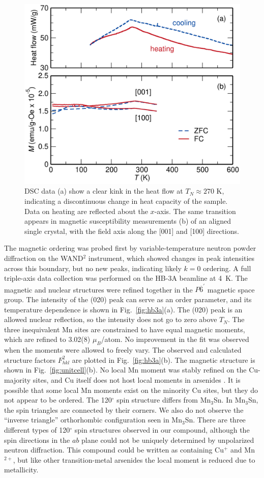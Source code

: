 \documentclass[10pt,doublespacing,edeposit]{uiucthesis2020}
\begin{document}
\begin{mainmatter}
\begin{figure}
\centering\includegraphics[width=0.6\columnwidth]{figures/ch5/dsc-mpms_norm_cropped.pdf}
\caption{
DSC data (a) show a clear kink in the heat flow at $T_N \approx 270$ K, indicating a discontinuous change in heat capacity of the sample. Data on heating are reflected about the $x$-axis. The same transition appears in magnetic susceptibility measurements (b) of an aligned single crystal, with the field axis along the [001] and [100] directions.
} 
\label{fig:dsc-mpms}
\end{figure}

The magnetic ordering was probed first by variable-temperature neutron powder diffraction
on the WAND$^2$ instrument, which showed changes in peak intensities across this boundary, but no new peaks, indicating likely $k = 0$ ordering.
A full triple-axis data collection was performed on the HB-3A beamline at 4~K.
The magnetic and nuclear structures were refined together in the $P\overline{6}^\prime$ magnetic space group. 
The intensity of the (020) peak can serve as an order parameter, and its temperature dependence is shown in Fig.\ \ref{fig:hb3a}(a).
The (020) peak is an allowed nuclear reflection, so the intensity does not go to zero above $T_N$.
The three inequivalent Mn sites are constrained to have equal magnetic moments, which are refined to 3.02(8) $\mu_B$/atom.
No improvement in the fit was observed when the moments were allowed to freely vary.
The observed and calculated structure factors $F_{hkl}^2$ are plotted in Fig.\ \ref{fig:hb3a}(b).
The magnetic structure is shown in Fig.\ \ref{fig:unitcell}(b). 
No local Mn moment was stably refined on the Cu-majority sites, and Cu itself does not host local moments in arsenides \cite{pauwels_electrical_1973,sampathkumaran_enhanced_2003,sengupta_magnetic_2005}.
It is possible that some local Mn moments exist on the minority Cu sites, but they do not appear to be ordered.
{\color{black}The 120$^\circ$ spin structure differs from Mn$_3$Sn. In Mn$_3$Sn, the spin triangles are connected by their corners. We also do not observe the ``inverse triangle'' orthorhombic configuration seen in Mn$_3$Sn.\cite{Brown_1990} There are three different types of 120$^\circ$ spin structures observed in our compound, although the spin directions in the $ab$ plane could not be uniquely determined by unpolarized neutron diffraction.}
This compound could be written as containing Cu$^+$ and Mn$^{2+}$, but like other transition-metal arsenides the local moment is reduced due to metallicity.\cite{katsuraki_magnetic_1966,pytlik_magnetic_1985}


\end{mainmatter}
\end{document}
